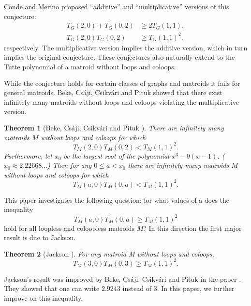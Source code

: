 \documentclass[12pt,a4paper]{amsart}
\numberwithin{equation}{section}
\theoremstyle{plain}
\newtheorem{Th}{Theorem}[section]
\theoremstyle{definition}
\newcommand{\1}{\textbf{1}}
\begin{document}
Conde and Merino \cite{conde2009comparing} proposed ``additive'' and ``multiplicative'' versions of this conjecture:
\begin{align*}
T_G(2,0) + T_G(0,2) &\geqslant 2T_G(1,1), \\
T_G(2,0)T_G(0,2) &\geqslant T_G(1,1)^2,  
\end{align*}
respectively. The multiplicative version implies the additive version, which in turn implies the original conjecture. These conjectures also naturally extend to the Tutte polynomial of a matroid without loops and coloops.

While the conjecture holds for certain classes of graphs \cite{lin2013note, noble2014merino, thomassen2010spanning} and matroids \cite{chavez2011some,ferroni2023merino,knauer2018tutte,kung2021inconsequential,merino2009note} it fails for general matroids. Beke, Cs\'aji, Csikv\'ari and Pituk \cite{beke2024merino} showed that there exist infinitely many matroids without loops and coloops violating the multiplicative version.



\begin{Th}[Beke, Cs\'aji, Csikv\'ari and Pituk \cite{beke2024merino}] \label{counter example}
There are infinitely many matroids $M$ without loops and coloops for which 
$$T_M(2,0)T_M(0,2)<T_M(1,1)^2.$$
Furthermore, let $x_0$ be the largest root of the polynomial $x^3-9(x-1)$. ($x_0\approx 2.22668...$)  Then for any $0\leqslant a<x_0$ there are infinitely many matroids $M$ without loops and coloops for which 
$$T_M(a,0)T_M(0,a)<T_M(1,1)^2.$$
\end{Th}

This paper investigates the following question: for what values of a does the inequality
\begin{equation*}
T_M(a,0)T_M(0,a) \geqslant T_M(1,1)^2
\end{equation*}
hold for all loopless and coloopless matroids $M$? In this direction the first major result is due to Jackson.

\begin{Th}[Jackson \cite{jackson2010inequality}]
For any matroid M without loops and coloops,
\begin{equation*}
T_M(3,0)T_M(0,3) \geqslant T_M(1,1)^2.
\end{equation*}
\end{Th}

Jackson's result was improved by Beke, Cs\'aji, Csikv\'ari and Pituk in the paper \cite{beke2024permutation}. They showed that one can write $2.9243$ instead of $3$. In this paper, we further improve on this inequality.
\end{document}
